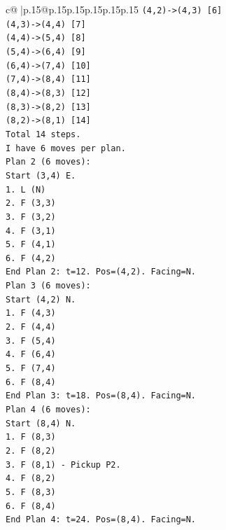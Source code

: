 \documentclass{article}
\begin{document}
{\begin{supertabular}{c@{$\;$}|p{.15\linewidth}@{}p{.15\linewidth}p{.15\linewidth}p{.15\linewidth}p{.15\linewidth}p{.15\linewidth}}
{{{\texttt{(4,2){-}>(4,3) {[}6{]}} \\
\texttt{(4,3){-}>(4,4) {[}7{]}} \\
\texttt{(4,4){-}>(5,4) {[}8{]}} \\
\texttt{(5,4){-}>(6,4) {[}9{]}} \\
\texttt{(6,4){-}>(7,4) {[}10{]}} \\
\texttt{(7,4){-}>(8,4) {[}11{]}} \\
\texttt{(8,4){-}>(8,3) {[}12{]}} \\
\texttt{(8,3){-}>(8,2) {[}13{]}} \\
\texttt{(8,2){-}>(8,1) {[}14{]}} \\
\texttt{Total 14 steps.} \\
\texttt{I have 6 moves per plan.} \\
\texttt{Plan 2 (6 moves):} \\
\texttt{Start (3,4) E.} \\
\texttt{1. L (N)} \\
\texttt{2. F (3,3)} \\
\texttt{3. F (3,2)} \\
\texttt{4. F (3,1)} \\
\texttt{5. F (4,1)} \\
\texttt{6. F (4,2)} \\
\texttt{End Plan 2: t=12. Pos=(4,2). Facing=N.} \\
\texttt{Plan 3 (6 moves):} \\
\texttt{Start (4,2) N.} \\
\texttt{1. F (4,3)} \\
\texttt{2. F (4,4)} \\
\texttt{3. F (5,4)} \\
\texttt{4. F (6,4)} \\
\texttt{5. F (7,4)} \\
\texttt{6. F (8,4)} \\
\texttt{End Plan 3: t=18. Pos=(8,4). Facing=N.} \\
\texttt{Plan 4 (6 moves):} \\
\texttt{Start (8,4) N.} \\
\texttt{1. F (8,3)} \\
\texttt{2. F (8,2)} \\
\texttt{3. F (8,1) {-} Pickup P2.} \\
\texttt{4. F (8,2)} \\
\texttt{5. F (8,3)} \\
\texttt{6. F (8,4)} \\
\texttt{End Plan 4: t=24. Pos=(8,4). Facing=N.} \\
}}}
\end{supertabular}}
\end{document}
